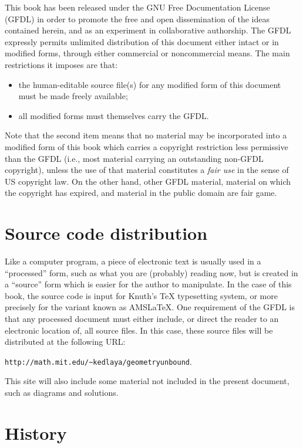 \documentclass[12pt]{book}
\numberwithin{exc}{section}
\numberwithin{figure}{section}
\numberwithin{equation}{theorem}
\begin{document}
This book has been released under the GNU Free Documentation License (GFDL)
in order to promote the free and open dissemination of the ideas contained
herein, and as an experiment in collaborative authorship. 
The GFDL expressly permits unlimited distribution of this document
either intact or in modified forms, through either 
commercial or noncommercial means. 
The main restrictions it imposes are that:
\begin{itemize}
\item
the human-editable source file(s) for any modified form of this document must
be made freely available;
\item
all modified forms must themselves carry the GFDL.
\end{itemize}
Note that the second item means that no material may be incorporated into
a modified form of this book which carries a copyright restriction less
permissive than the GFDL (i.e., most material carrying an outstanding 
non-GFDL copyright), unless the use of that material constitutes a \emph{fair
use}  in the sense of US copyright law.
On the other hand, other GFDL material, material on which the copyright
has expired, and material in the public domain are fair game.

\section{Source code distribution}

Like a computer program, a piece of electronic text is usually used in
a ``processed'' form, such as what you are (probably) reading now,
but is created in a ``source'' form which is easier for the author to
manipulate. In the case of this book, the source code is input for Knuth's
TeX typesetting system, or more precisely for the variant known as AMSLaTeX.
One requirement of the GFDL is that any processed document must either 
include, or direct the reader to an electronic location of, all source files.
In this case, these source files will be distributed at the following URL:

\begin{center}
\texttt{http://math.mit.edu/\~{}kedlaya/geometryunbound}.
\end{center}

This site will also include some material not included in the present document,
such as diagrams and solutions.

\section{History}
\end{document}
